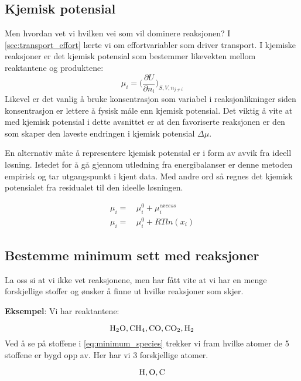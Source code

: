 \subsection{Kjemisk potensial}
Men hvordan vet vi hvilken vei som vil dominere reaksjonen? I \cref{sec:transport_effort} lærte vi om effortvariabler som driver transport. I kjemiske reaksjoner er det kjemisk potensial som bestemmer likevekten mellom reaktantene og produktene:
\begin{equation}
    \mu_i = \Big(
    \frac{\partial U}{\partial n_i}
    \Big)_{S,V,n_{j\neq i}}
\end{equation}
Likevel er det vanlig å bruke konsentrasjon som variabel i reaksjonlikninger siden konsentrasjon er lettere å fysisk måle enn kjemisk potensial. Det viktig å vite at med kjemisk potensial i dette avsnittet er at den favoriserte reaksjonen er den som skaper den laveste endringen i kjemisk potensial $\Delta \mu$. 

En alternativ måte å representere kjemisk potensial er i form av avvik fra ideell løsning. Istedet for å gå gjennom utledning fra energibalanser er denne metoden empirisk og tar utgangspunkt i kjent data. Med andre ord så regnes det kjemisk potensialet fra residualet til den ideelle løsningen. 

\begin{equation}
    \begin{split}
    \mu_i =&\, \mu_{i}^0 +\mu_{i}^{excess}\\
    \mu_i =&\, \mu_{i}^0 + RTln(x_i) 
    \end{split}
\end{equation}


\subsection{Bestemme minimum sett med reaksjoner}\label{sec:set_med_reaksjoner}
La oss si at vi ikke vet reaksjonene, men har fått vite at vi har en menge forskjellige stoffer og ønsker å finne ut hvilke reaksjoner som skjer. 

\textbf{Eksempel}:
Vi har reaktantene:

\begin{equation}
    \label{eq:minimum_species}
   \ce{H2O,CH4,CO,CO2,H2}
\end{equation}
Ved å se på stoffene i \cref{eq:minimum_species} trekker vi fram hvilke atomer de 5 stoffene er bygd opp av. Her har vi 3 forskjellige atomer.

\begin{equation}
    \label{eq:minimum_species_atom}
    \ce{H,O,C}
\end{equation}

